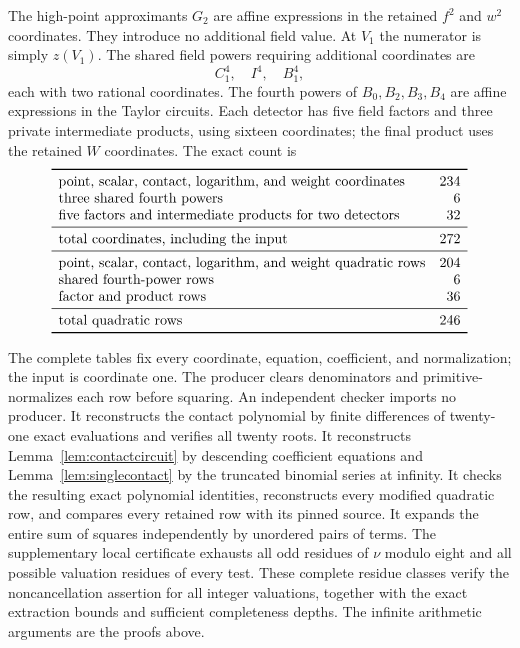 \documentclass[11pt,a4paper]{article}
\begin{document}
The high-point approximants $G_2$ are affine expressions in the
retained $f^2$ and $w^2$ coordinates. They introduce no additional
field value. At $V_1$ the numerator is simply $z(V_1)$.
The shared field powers requiring additional coordinates are
\[
                              C_1^4,\quad I^4,\quad B_1^4,
\]
each with two rational coordinates. The fourth powers of
$B_0,B_2,B_3,B_4$ are affine expressions in the Taylor circuits.
Each detector has five field factors and three private intermediate
products, using sixteen coordinates; the final product uses the
retained $W$ coordinates. The exact count is
\[
\begin{array}{lr}\toprule
\text{point, scalar, contact, logarithm, and weight coordinates}&234\\
\text{three shared fourth powers}&6\\
\text{five factors and intermediate products for two detectors}&32\\\midrule
\text{total coordinates, including the input}&272\\\midrule
\text{point, scalar, contact, logarithm, and weight quadratic rows}&204\\
\text{shared fourth-power rows}&6\\
\text{factor and product rows}&36\\\midrule
\text{total quadratic rows}&246\\\bottomrule
\end{array}
\]

The complete tables fix every coordinate, equation, coefficient, and
normalization; the input is coordinate one. The producer clears
denominators and primitive-normalizes each row before squaring.
An independent checker imports no producer. It reconstructs the
contact polynomial by finite differences of twenty-one exact
evaluations and verifies all twenty roots. It reconstructs
Lemma~\ref{lem:contactcircuit} by descending coefficient equations
and Lemma~\ref{lem:singlecontact} by the truncated binomial series
at infinity. It checks the resulting exact polynomial identities,
reconstructs every modified
quadratic row, and compares every retained row with its pinned source.
It expands the entire sum of squares independently by unordered
pairs of terms. The supplementary local certificate exhausts all
odd residues of $\nu$ modulo eight and all possible valuation residues
of every test. These complete residue classes verify the
noncancellation assertion for all integer valuations, together with
the exact extraction bounds and sufficient completeness depths.
The infinite arithmetic arguments are the proofs above.
\end{document}
